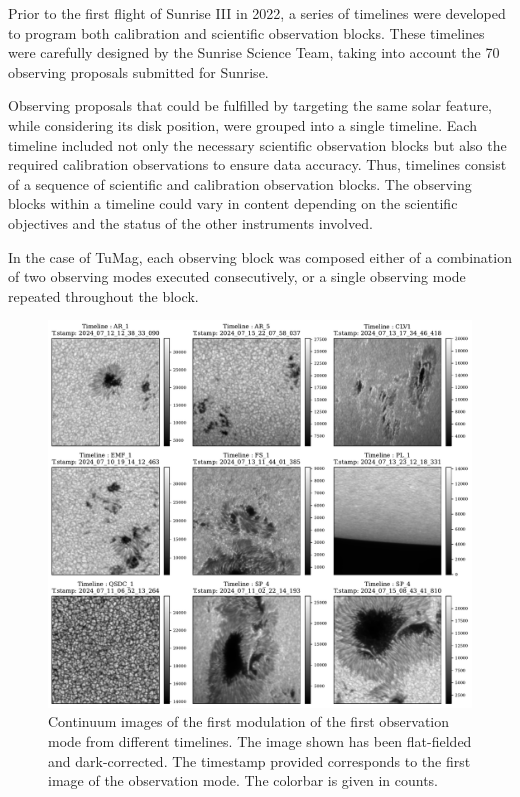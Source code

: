 Prior to the first flight of Sunrise III in 2022, a series of timelines were developed to program both calibration and scientific observation blocks. These timelines were carefully designed by the Sunrise Science Team, taking into account the 70 observing proposals submitted for Sunrise.

Observing proposals that could be fulfilled by targeting the same solar feature, while considering its disk position, were grouped into a single timeline. Each timeline included not only the necessary scientific observation blocks but also the required calibration observations to ensure data accuracy. Thus, timelines consist of a sequence of scientific and calibration observation blocks. The observing blocks within a timeline could vary in content depending on the scientific objectives and the status of the other instruments involved.

In the case of TuMag, each observing block was composed either of a combination of two observing modes executed consecutively, or a single observing mode repeated throughout the block.  

\begin{figure}
  \includegraphics[width=\textwidth]{figures/Pipeline/timelines_Examples.pdf}
  \caption[Timelines mosaic.]{
    Continuum images of the first modulation of the first observation mode from different timelines. The image shown has been flat-fielded and dark-corrected. The timestamp provided corresponds to the first image of the observation mode. The colorbar is given in counts.}
    \label{fig_pipeline: timeline_examples}
\end{figure}

